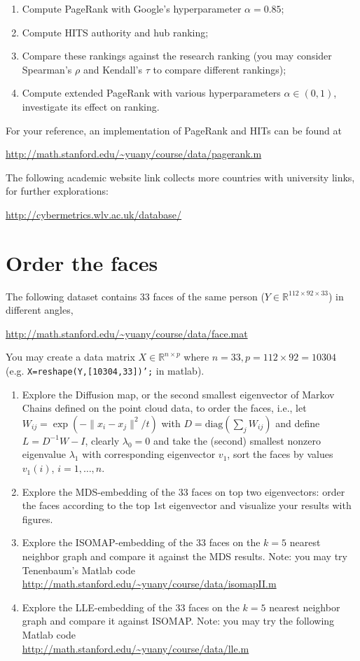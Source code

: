 \documentclass[11pt]{article}
\def\R{{\mathbb R}}
\def\diag{{\mathrm{diag}}}
\begin{document}
\begin{enumerate}
\item Compute PageRank with Google's hyperparameter $\alpha=0.85$;
\item Compute HITS authority and hub ranking; 
\item Compare these rankings against the research ranking (you may consider Spearman's $\rho$ and Kendall's $\tau$ to compare different rankings);  
\item Compute extended PageRank with various hyperparameters $\alpha\in (0,1)$, investigate its effect on ranking. 
\end{enumerate} 

For your reference, an implementation of PageRank and HITs can be found at 

\url{http://math.stanford.edu/~yuany/course/data/pagerank.m}

The following academic website link collects more countries with university links, for further explorations:

\url{http://cybermetrics.wlv.ac.uk/database/} 

\section{Order the faces}
The following dataset contains 33 faces of the same person ($Y\in \R^{112\times 92\times33}$) in different angles,

\url{http://math.stanford.edu/~yuany/course/data/face.mat}

You may create a data matrix $X\in \R^{n\times p}$ where $n=33,p=112\times92=10304$ \\ (e.g. {\texttt{X=reshape(Y,[10304,33])';}} in matlab).

\begin{enumerate}
\item Explore the Diffusion map, or the second smallest eigenvector of Markov Chains defined on the point cloud data, to order the faces, i.e., let $W_{ij}=\exp(-\|x_i - x_j\|^2/t)$ with $D=\diag(\sum_j W_{ij})$ and define $L=D^{-1} W - I$, clearly $\lambda_0=0$ and take the (second) smallest nonzero eigenvalue $\lambda_1$ with corresponding eigenvector $v_1$, sort the faces by values $v_1(i)$, $i=1,\ldots,n$.  
\item Explore the MDS-embedding of the 33 faces on top two eigenvectors: order the faces according to the top 1st eigenvector and visualize your results with figures. 
\item Explore the ISOMAP-embedding of the 33 faces on the $k=5$ nearest neighbor graph and compare it against the MDS results. Note: you may try Tenenbaum's Matlab code \\
{\url{http://math.stanford.edu/~yuany/course/data/isomapII.m}}
\item Explore the LLE-embedding of the 33 faces on the $k=5$ nearest neighbor graph and compare it against ISOMAP. Note: you may try the following Matlab code \\
{\url{http://math.stanford.edu/~yuany/course/data/lle.m}}
\end{enumerate}
\end{document}
